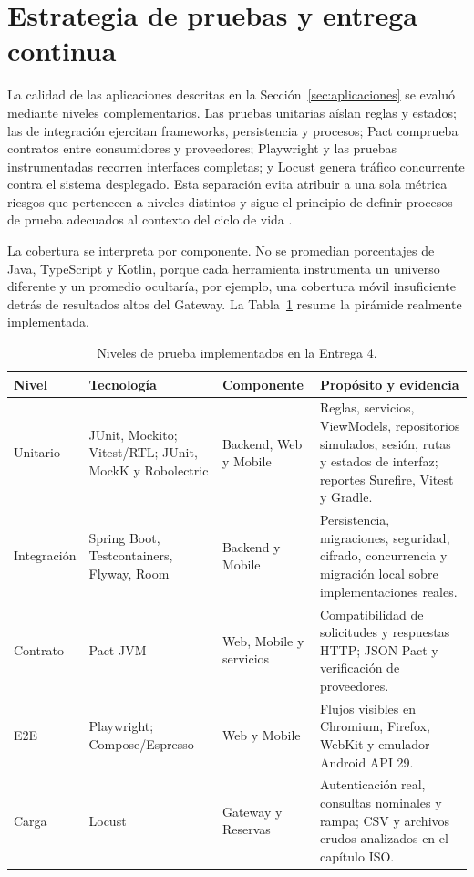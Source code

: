 \section{Estrategia de pruebas y entrega continua}
\label{sec:pruebas-cicd}

La calidad de las aplicaciones descritas en la
Sección~\ref{sec:aplicaciones} se evaluó mediante niveles complementarios. Las
pruebas unitarias aíslan reglas y estados; las de integración ejercitan
frameworks, persistencia y procesos; Pact comprueba contratos entre
consumidores y proveedores; Playwright y las pruebas instrumentadas recorren
interfaces completas; y Locust genera tráfico concurrente contra el sistema
desplegado. Esta separación evita atribuir a una sola métrica riesgos que
pertenecen a niveles distintos y sigue el principio de definir procesos de
prueba adecuados al contexto del ciclo de vida \cite{iso29119_2_2021}.

La cobertura se interpreta por componente. No se promedian porcentajes de Java,
TypeScript y Kotlin, porque cada herramienta instrumenta un universo diferente
y un promedio ocultaría, por ejemplo, una cobertura móvil insuficiente detrás de
resultados altos del Gateway. La Tabla~\ref{tab:piramide-pruebas} resume la
pirámide realmente implementada.

\begin{table}[ht]
  \centering
  \small
  \caption{Niveles de prueba implementados en la Entrega 4.}
  \label{tab:piramide-pruebas}
  \begin{tabular}{|p{2.0cm}|p{2.8cm}|p{3.0cm}|p{4.8cm}|}
    \hline
    \textbf{Nivel} & \textbf{Tecnología} & \textbf{Componente} & \textbf{Propósito y evidencia} \\
    \hline
    Unitario & JUnit, Mockito; Vitest/RTL; JUnit, MockK y Robolectric & Backend, Web y Mobile & Reglas, servicios, ViewModels, repositorios simulados, sesión, rutas y estados de interfaz; reportes Surefire, Vitest y Gradle. \\
    \hline
    Integración & Spring Boot, Testcontainers, Flyway, Room & Backend y Mobile & Persistencia, migraciones, seguridad, cifrado, concurrencia y migración local sobre implementaciones reales. \\
    \hline
    Contrato & Pact JVM & Web, Mobile y servicios & Compatibilidad de solicitudes y respuestas HTTP; JSON Pact y verificación de proveedores. \\
    \hline
    E2E & Playwright; Compose/Espresso & Web y Mobile & Flujos visibles en Chromium, Firefox, WebKit y emulador Android API 29. \\
    \hline
    Carga & Locust & Gateway y Reservas & Autenticación real, consultas nominales y rampa; CSV y archivos crudos analizados en el capítulo ISO. \\
    \hline
  \end{tabular}
\end{table}

